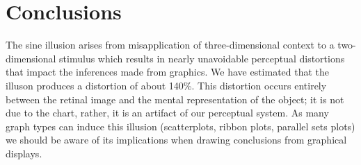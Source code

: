 \documentclass[journal]{vgtc}\usepackage{graphicx, color}
\begin{document}
\section{Conclusions}
The sine illusion arises from misapplication of three-dimensional context to a two-dimensional stimulus which results in nearly unavoidable perceptual distortions that impact the inferences made from graphics. We have estimated that the illuson produces a distortion of about 140\%. This distortion occurs entirely between the retinal image and the mental representation of the object; it is not due to the chart, rather, it is an artifact of our perceptual system. As many graph types can induce this illusion (scatterplots, ribbon plots, parallel sets plots) we should be aware of its implications when drawing conclusions from graphical displays.

\clearpage


\end{document}
